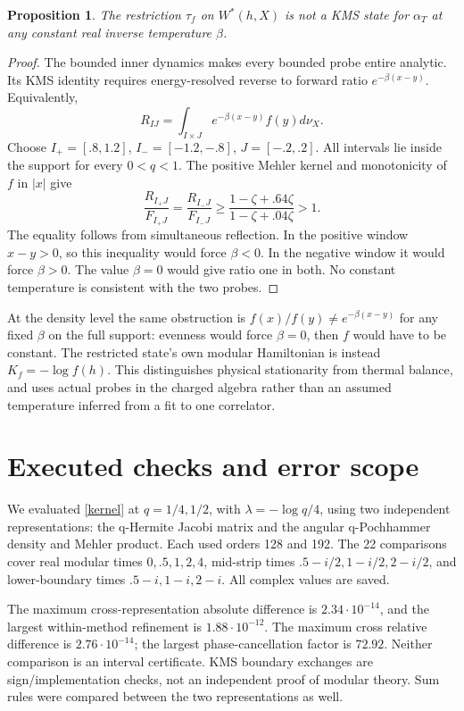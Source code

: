 \documentclass[11pt]{article}
\newtheorem{proposition}{Proposition}
\begin{document}
\begin{proposition}
The restriction $\tau_f$ on $W^*(h,X)$ is not a KMS state for
$\alpha_T$ at any constant real inverse temperature $\beta$.
\end{proposition}
\begin{proof}
The bounded inner dynamics makes every bounded probe entire
analytic. Its KMS identity requires energy-resolved reverse to
forward ratio $e^{-\beta(x-y)}$. Equivalently,
\[
 R_{IJ}=\int_{I\times J}e^{-\beta(x-y)}f(y)d\nu_X.
\]
Choose $I_+=[.8,1.2]$, $I_-=[-1.2,-.8]$, $J=[-.2,.2]$.
All intervals lie inside the support for every $0<q<1$.
The positive Mehler kernel and monotonicity of $f$ in $|x|$ give
\begin{equation}\label{ratio}
 \frac{R_{I_+J}}{F_{I_+J}}
 =\frac{R_{I_-J}}{F_{I_-J}}
 \ge\frac{1-\zeta+.64\zeta}{1-\zeta+.04\zeta}>1.
\end{equation}
The equality follows from simultaneous reflection. In the
positive window $x-y>0$, so this inequality would force
$\beta<0$. In the negative window it would force $\beta>0$.
The value $\beta=0$ would give ratio one in both. No constant
temperature is consistent with the two probes.
\end{proof}

At the density level the same obstruction is
$f(x)/f(y)\ne e^{-\beta(x-y)}$ for any fixed $\beta$ on the
full support: evenness would force $\beta=0$, then $f$ would
have to be constant. The restricted state's own modular
Hamiltonian is instead $K_f=-\log f(h)$.
This distinguishes physical stationarity from thermal balance,
and uses actual probes in the charged algebra rather than an
assumed temperature inferred from a fit to one correlator.

\newpage
\section{Executed checks and error scope}
We evaluated \eqref{kernel} at $q=1/4,1/2$, with
$\lambda=-\log q/4$, using two independent representations:
the q-Hermite Jacobi matrix and the angular q-Pochhammer density
and Mehler product. Each used orders 128 and 192.
The 22 comparisons cover real modular times $0,.5,1,2,4$,
mid-strip times $.5-i/2,1-i/2,2-i/2$, and lower-boundary times
$.5-i,1-i,2-i$. All complex values are saved.

The maximum cross-representation absolute difference is
$2.34\cdot10^{-14}$, and the largest within-method refinement
is $1.88\cdot10^{-12}$. The maximum cross relative difference
is $2.76\cdot10^{-14}$; the largest phase-cancellation factor
is $72.92$. Neither comparison is an interval certificate.
KMS boundary exchanges are sign/implementation checks, not an
independent proof of modular theory. Sum rules were compared
between the two representations as well.
\end{document}
